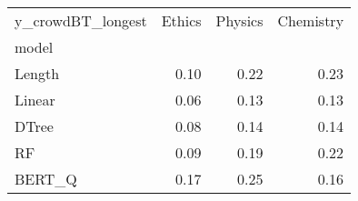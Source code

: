 \begin{tabular}{lrrr}
\toprule
y\_crowdBT\_longest &  Ethics &  Physics &  Chemistry \\
model  &         &          &            \\
\midrule
Length &    0.10 &     0.22 &       0.23 \\
Linear &    0.06 &     0.13 &       0.13 \\
DTree  &    0.08 &     0.14 &       0.14 \\
RF     &    0.09 &     0.19 &       0.22 \\
BERT\_Q &    0.17 &     0.25 &       0.16 \\
\bottomrule
\end{tabular}
